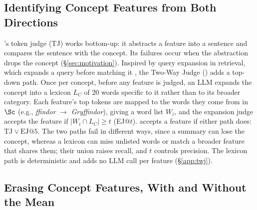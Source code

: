 \subsection{Identifying Concept Features from Both Directions}
\label{sec:twj}

\ember{}'s token judge (TJ) works bottom-up: it abstracts a feature into a sentence and compares the sentence with the concept.
Its failures occur when the abstraction drops the concept (\S\ref{sec:motivation}).
Inspired by query expansion in retrieval, which expands a query before matching it \citep{wang2023query2doc,gao2023hyde}, the Two-Way Judge (\twj{}) adds a top-down path.
Once per concept, before any feature is judged, an LLM expands the concept into a lexicon $L_C$ of 20 words specific to it rather than to its broader category.
Each feature's top tokens are mapped to the words they come from in $\Sc$ (e.g., \textit{ffindor} $\to$ \textit{Gryffindor}), giving a word list $W_i$, and the expansion judge accepts the feature if $|W_i \cap L_C| \ge t$ (EJ@$t$).
\twj{} accepts a feature if either path does: $\text{TJ} \vee \text{EJ@}5$.
The two paths fail in different ways, since a summary can lose the concept, whereas a lexicon can miss unlisted words or match a broader feature that shares them; their union raises recall, and $t$ controls precision.
The lexicon path is deterministic and adds no LLM call per feature (\S\ref{app:twj}).

\subsection{Erasing Concept Features, With and Without the Mean}
\label{sec:cinderz}

